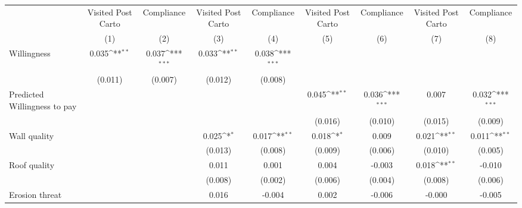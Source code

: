 {
\def\sym#1{\ifmmode^{#1}\else\(^{#1}\)\fi}
\begin{tabular}{l*{8}{c}}
\hline\hline
                &\multicolumn{1}{c}{Visited Post Carto}&\multicolumn{1}{c}{Compliance}&\multicolumn{1}{c}{Visited Post Carto}&\multicolumn{1}{c}{Compliance}&\multicolumn{1}{c}{Visited Post Carto}&\multicolumn{1}{c}{Compliance}&\multicolumn{1}{c}{Visited Post Carto}&\multicolumn{1}{c}{Compliance}\\
                &\multicolumn{1}{c}{(1)}         &\multicolumn{1}{c}{(2)}         &\multicolumn{1}{c}{(3)}         &\multicolumn{1}{c}{(4)}         &\multicolumn{1}{c}{(5)}         &\multicolumn{1}{c}{(6)}         &\multicolumn{1}{c}{(7)}         &\multicolumn{1}{c}{(8)}         \\
\hline
Willingness     &    0.035\sym{**} &    0.037\sym{***}&    0.033\sym{**} &    0.038\sym{***}&                  &                  &                  &                  \\
                &  (0.011)         &  (0.007)         &  (0.012)         &  (0.008)         &                  &                  &                  &                  \\
Predicted Willingness to pay&                  &                  &                  &                  &    0.045\sym{**} &    0.036\sym{***}&    0.007         &    0.032\sym{***}\\
                &                  &                  &                  &                  &  (0.016)         &  (0.010)         &  (0.015)         &  (0.009)         \\
Wall quality    &                  &                  &    0.025\sym{*}  &    0.017\sym{**} &    0.018\sym{*}  &    0.009         &    0.021\sym{**} &    0.011\sym{**} \\
                &                  &                  &  (0.013)         &  (0.008)         &  (0.009)         &  (0.006)         &  (0.010)         &  (0.005)         \\
Roof quality    &                  &                  &    0.011         &    0.001         &    0.004         &   -0.003         &    0.018\sym{**} &   -0.010         \\
                &                  &                  &  (0.008)         &  (0.002)         &  (0.006)         &  (0.004)         &  (0.008)         &  (0.006)         \\
Erosion threat  &                  &                  &    0.016         &   -0.004         &    0.002         &   -0.006         &   -0.000         &   -0.005         \\

\end{tabular}}

